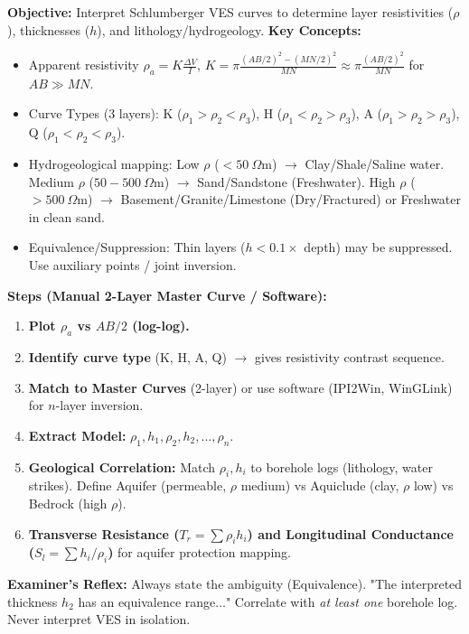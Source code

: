 \documentclass[11pt]{article}
\begin{document}
\begin{methode}
\textbf{Objective:} Interpret Schlumberger VES curves to determine layer resistivities ($\rho$), thicknesses ($h$), and lithology/hydrogeology.
\textbf{Key Concepts:}
\begin{itemize}
    \item Apparent resistivity $\rho_a = K \frac{\Delta V}{I}$, $K = \pi \frac{(AB/2)^2 - (MN/2)^2}{MN} \approx \pi \frac{(AB/2)^2}{MN}$ for $AB \gg MN$.
    \item Curve Types (3 layers): K ($\rho_1 > \rho_2 < \rho_3$), H ($\rho_1 < \rho_2 > \rho_3$), A ($\rho_1 > \rho_2 > \rho_3$), Q ($\rho_1 < \rho_2 < \rho_3$).
    \item Hydrogeological mapping: Low $\rho$ ($< 50\ \Omega$m) $\to$ Clay/Shale/Saline water. Medium $\rho$ ($50-500\ \Omega$m) $\to$ Sand/Sandstone (Freshwater). High $\rho$ ($> 500\ \Omega$m) $\to$ Basement/Granite/Limestone (Dry/Fractured) or Freshwater in clean sand.
    \item Equivalence/Suppression: Thin layers ($h < 0.1 \times$ depth) may be suppressed. Use auxiliary points / joint inversion.
\end{itemize}
\textbf{Steps (Manual 2-Layer Master Curve / Software):}
\begin{enumerate}
    \item \textbf{Plot $\rho_a$ vs $AB/2$ (log-log).}
    \item \textbf{Identify curve type} (K, H, A, Q) $\to$ gives resistivity contrast sequence.
    \item \textbf{Match to Master Curves} (2-layer) or use software (IPI2Win, WinGLink) for $n$-layer inversion.
    \item \textbf{Extract Model:} $\rho_1, h_1, \rho_2, h_2, \dots, \rho_n$.
    \item \textbf{Geological Correlation:} Match $\rho_i, h_i$ to borehole logs (lithology, water strikes). Define Aquifer (permeable, $\rho$ medium) vs Aquiclude (clay, $\rho$ low) vs Bedrock (high $\rho$).
    \item \textbf{Transverse Resistance ($T_r = \sum \rho_i h_i$) and Longitudinal Conductance ($S_l = \sum h_i/\rho_i$)} for aquifer protection mapping.
\end{enumerate}
\textbf{Examiner's Reflex:} Always state the ambiguity (Equivalence). "The interpreted thickness $h_2$ has an equivalence range..." Correlate with \emph{at least one} borehole log. Never interpret VES in isolation.
\end{methode}
\end{document}
